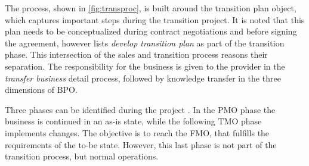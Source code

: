 	The process, shown in \Fig \ref{fig:transproc}, is built around the transition plan object, which captures important steps during the transition project. It is noted that this plan needs to be conceptualized during contract negotiations and before signing the agreement, however \cite{deloittehandbook} lists \textit{develop transition plan} as part of the transition phase. This intersection of the sales and transition process reasons their separation. The responsibility for the business is given to the provider in the \textit{transfer business} detail process, followed by knowledge transfer in the three dimensions of \acrshort{BPO}. 
	
	Three phases can be identified during the project \citep{bitkom2008, 0273705601}. In the \acrfull{PMO} phase the business is continued in an as-is state, while the following  \acrfull{TMO} phase implements changes. The objective is to reach the \acrfull{FMO}, that fulfills the requirements of the to-be state. However, this last phase is not part of the transition process, but normal operations. 
	
